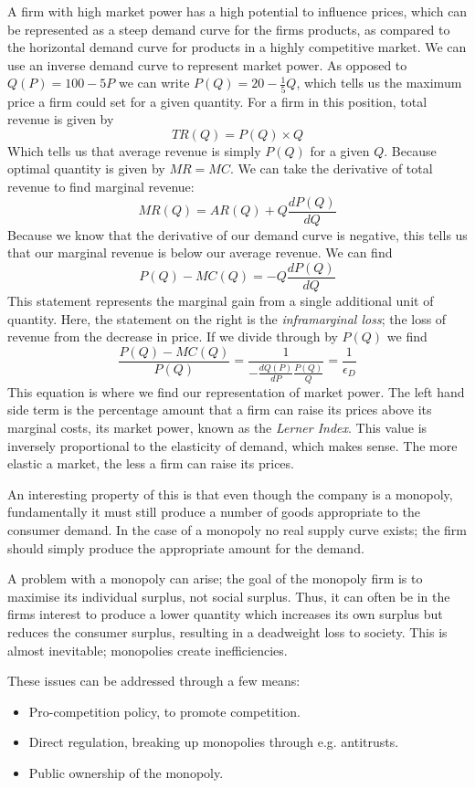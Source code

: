 \documentclass[12pt]{report}
\begin{document}
\begin{flushleft}
\bigskip
A firm with high market power has a high potential to influence prices, which
can be represented as a steep demand curve for the firms products, as compared
to the horizontal demand curve for products in a highly competitive market. We
can use an inverse demand curve to represent market power. As opposed to 
\(Q(P) = 100 - 5P\) we can write \(P(Q) = 20 - \frac{1}{5}Q\), which tells us
the maximum price a firm could set for a given quantity. For a firm in this
position, total revenue is given by
\[TR(Q) = P(Q) \times Q\]
Which tells us that average revenue is simply \(P(Q)\) for a given \(Q\). 
Because optimal quantity is given by \(MR = MC\). We can take the derivative
of total revenue to find marginal revenue:
\[MR(Q) = AR(Q) + Q\frac{dP(Q)}{dQ}\]
Because we know that the derivative of our demand curve is negative, this tells
us that our marginal revenue is below our average revenue. We can find 
\[P(Q) - MC(Q) = -Q\frac{dP(Q)}{dQ}\]
This statement represents the marginal gain from a single additional unit of
quantity. Here, the statement on the right is the \textit{inframarginal loss};
the loss of revenue from the decrease in price. If we divide through by 
\(P(Q)\) we find
\[\frac{P(Q) - MC(Q)}{P(Q)} = \frac{1}{-\frac{dQ(P)}{dP}\frac{P(Q)}{Q}} = 
\frac{1}{\epsilon_D}\]
This equation is where we find our representation of market power. The left
hand side term is the percentage amount that a firm can raise its prices above
its marginal costs, its market power, known as the \textit{Lerner Index}. This
value is inversely proportional to the elasticity of demand, which makes sense.
The more elastic a market, the less a firm can raise its prices.

\bigskip
An interesting property of this is that even though the company is a monopoly,
fundamentally it must still produce a number of goods appropriate to the 
consumer demand. In the case of a monopoly no real supply curve exists; the 
firm should simply produce the appropriate amount for the demand.

\bigskip
A problem with a monopoly can arise; the goal of the monopoly firm is to 
maximise its individual surplus, not social surplus. Thus, it can often be in
the firms interest to produce a lower quantity which increases its own surplus
but reduces the consumer surplus, resulting in a deadweight loss to society.
This is almost inevitable; monopolies create inefficiencies.

\bigskip
These issues can be addressed through a few means:

\begin{itemize}
    \item Pro-competition policy, to promote competition.
    \item Direct regulation, breaking up monopolies through e.g. antitrusts.
    \item Public ownership of the monopoly.
\end{itemize}


\end{flushleft}
\end{document}
